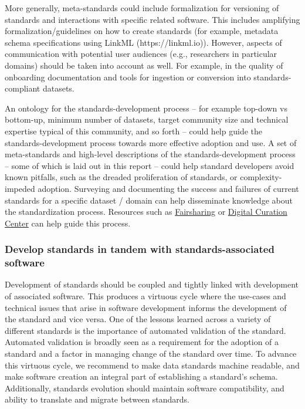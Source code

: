 \documentclass[
  number]{elsarticle}
\begin{document}
More generally, meta-standards could include formalization for
versioning of standards and interactions with specific related software.
This includes amplifying formalization/guidelines on how to create
standards (for example, metadata schema specifications using LinkML
(https://linkml.io)). However, aspects of communication with potential
user audiences (e.g., researchers in particular domains) should be taken
into account as well. For example, in the quality of onboarding
documentation and tools for ingestion or conversion into
standards-compliant datasets.

An ontology for the standards-development process -- for example
top-down vs bottom-up, minimum number of datasets, target community size
and technical expertise typical of this community, and so forth -- could
help guide the standards-development process towards more effective
adoption and use. A set of meta-standards and high-level descriptions of
the standards-development process -- some of which is laid out in this
report -- could help standard developers avoid known pitfalls, such as
the dreaded proliferation of standards, or complexity-impeded adoption.
Surveying and documenting the success and failures of current standards
for a specific dataset / domain can help disseminate knowledge about the
standardization process. Resources such as
\href{https://fairsharing.org/}{Fairsharing} or
\href{https://www.dcc.ac.uk/guidance/standards}{Digital Curation Center}
can help guide this process.

\subsubsection{Develop standards in tandem with standards-associated
software}\label{develop-standards-in-tandem-with-standards-associated-software}

Development of standards should be coupled and tightly linked with
development of associated software. This produces a virtuous cycle where
the use-cases and technical issues that arise in software development
informs the development of the standard and vice versa. One of the
lessons learned across a variety of different standards is the
importance of automated validation of the standard. Automated validation
is broadly seen as a requirement for the adoption of a standard and a
factor in managing change of the standard over time. To advance this
virtuous cycle, we recommend to make data standards machine readable,
and make software creation an integral part of establishing a standard's
schema. Additionally, standards evolution should maintain software
compatibility, and ability to translate and migrate between standards.
\end{document}
